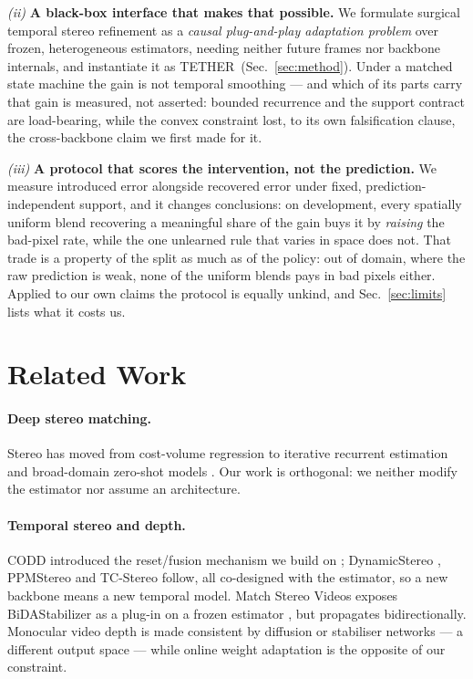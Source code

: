 \documentclass[letterpaper,10pt,conference]{ieeeconf}
\newcommand{\steer}{TETHER}
\begin{document}
\emph{(ii)} \textbf{A black-box interface that makes that possible.} We
formulate surgical temporal stereo refinement as a \emph{causal
plug-and-play adaptation problem} over frozen, heterogeneous estimators,
needing neither future frames nor backbone internals, and instantiate it as
\steer\ (Sec.~\ref{sec:method}). Under a matched state machine the gain is not
temporal smoothing --- and which of its parts carry that gain is measured, not
asserted: bounded recurrence and the support contract are load-bearing, while
the convex constraint lost, to its own falsification clause, the
cross-backbone claim we first made for it.

\emph{(iii)} \textbf{A protocol that scores the intervention, not the
prediction.} We measure introduced error alongside recovered error under
fixed, prediction-independent support, and it changes conclusions: on
development, every spatially uniform blend recovering a meaningful share of
the gain buys it by \emph{raising} the bad-pixel rate, while the one unlearned
rule that varies in space does not. That trade is a property of the split as
much as of the policy: out of domain, where the raw prediction is weak, none
of the uniform blends pays in bad pixels either. Applied to our own claims the
protocol is equally unkind, and Sec.~\ref{sec:limits} lists what it costs us.

\section{Related Work}
\label{sec:related}

\paragraph{Deep stereo matching.}
Stereo has moved from cost-volume regression to iterative recurrent
estimation \cite{lipson2021raftstereo,li2022crestereo} and broad-domain
zero-shot models
\cite{bartolomei2025stereoanywhere,min2025s2m2,wen2026fastfoundationstereo}.
Our work is orthogonal: we neither modify the estimator nor assume an
architecture.

\paragraph{Temporal stereo and depth.}
CODD introduced the reset/fusion mechanism we build on
\cite{li2023codd}; DynamicStereo \cite{karaev2023dynamicstereo}, PPMStereo
\cite{wang2025ppm} and TC-Stereo \cite{zeng2024tcstereo} follow, all
co-designed with the estimator, so a new backbone means a new temporal model.
Match Stereo Videos exposes BiDAStabilizer as a plug-in on a frozen estimator
\cite{jing2024bida}, but propagates bidirectionally. Monocular video depth is
made consistent by diffusion \cite{hu2025depthcrafter} or stabiliser networks
\cite{wang2023nvds} --- a different output space --- while online weight
adaptation \cite{poggi2022continual} is the opposite
of our constraint.
\end{document}
